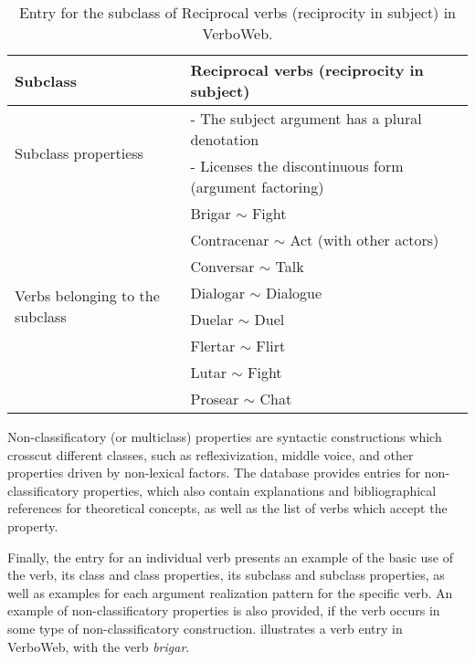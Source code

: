 \documentclass[english]{textolivre}
\begin{document}

\begin{table}[h!]
\centering
\begin{threeparttable}
\caption{Entry for the subclass of Reciprocal verbs (reciprocity in subject) in VerboWeb.}
\label{Table6}
\begin{tabular}{ll}
\toprule
 Subclass &	Reciprocal verbs (reciprocity in subject) \\
\midrule       
\multirow{2}{*}{Subclass propertiess} 
& - The subject argument has a plural denotation \\
& - Licenses the discontinuous form (argument factoring) \\
\midrule
\multirow{8}{*}{Verbs belonging to the subclass} 
& Brigar $\sim$ Fight \\	
& Contracenar $\sim$ Act (with other actors) \\	
& Conversar $\sim$ Talk 	\\
& Dialogar $\sim$ Dialogue \\
& Duelar $\sim$ Duel \\
& Flertar $\sim$ Flirt \\	
& Lutar $\sim$ Fight \\	
& Prosear $\sim$ Chat \\
\bottomrule
\end{tabular}
\end{threeparttable}
\end{table}

Non-classificatory (or multiclass) properties are syntactic constructions which crosscut different classes, such as reflexivization, middle voice, and other properties driven by non-lexical factors. The database provides entries for non-classificatory properties, which also contain explanations and bibliographical references for theoretical concepts, as well as the list of verbs which accept the property.

Finally, the entry for an individual verb presents an example of the basic use of the verb, its class and class properties, its subclass and subclass properties, as well as examples for each argument realization pattern for the specific verb. An example of non-classificatory properties is also provided, if the verb occurs in some type of non-classificatory construction.  illustrates a verb entry in VerboWeb, with the verb \textit{brigar}.
\end{document}
